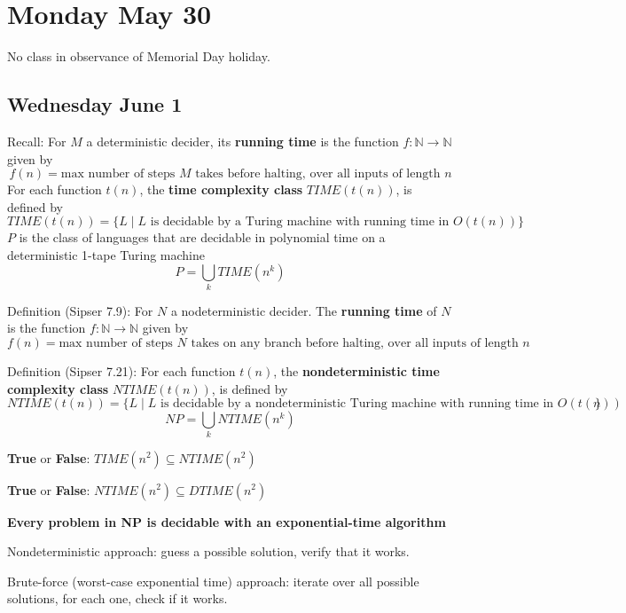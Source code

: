 \documentclass[12pt, oneside]{article}
\begin{document}
\begin{flushright}
\end{flushright} 
\section*{Monday May 30}

No class in observance of Memorial Day holiday.

\subsection*{Wednesday June 1}




Recall: For  $M$ a deterministic decider, its {\bf running time} is the function  $f: \mathbb{N} \to \mathbb{N}$
given  by
\[
f(n) =  \text{max number of  steps $M$ takes before halting, over all inputs  of length $n$}
\]
For each function $t(n)$, the {\bf time complexity class}  $TIME(t(n))$, is defined  by
\[
TIME( t(n)) = \{ L \mid \text{$L$ is decidable by  a Turing machine with running time in  $O(t(n))$} \}
\]
$P$ is the class of languages that  are decidable in polynomial time on 
a deterministic 1-tape  Turing  machine
\[
P  =  \bigcup_k TIME(n^k)
\]

Definition (Sipser  7.9): For $N$ a nodeterministic decider.  
The {\bf running time} of $N$ is the function $f: \mathbb{N} \to \mathbb{N}$ given  by
\[
f(n) =  \text{max number of  steps $N$ takes on  any branch before halting, over all inputs  of length $n$}
\]

Definition (Sipser 7.21): For each function $t(n)$, the {\bf nondeterministic time complexity class}  
$NTIME(t(n))$, is defined  by
\[
NTIME( t(n)) = \{ L \mid \text{$L$ is decidable by a nondeterministic Turing machine with running time in $O(t(n))$} \}
\]
\[
NP = \bigcup_k NTIME(n^k)
\]


{\bf True} or {\bf False}: $TIME(n^2) \subseteq NTIME(n^2)$

\vfill

{\bf True} or {\bf False}: $NTIME(n^2) \subseteq DTIME(n^2)$

\vfill


{\bf Every problem in NP is decidable with an exponential-time algorithm}

Nondeterministic approach: guess a possible solution, verify that it works.

Brute-force (worst-case exponential time) approach: iterate over all possible solutions, for each 
one, check if it works.
\end{document}
